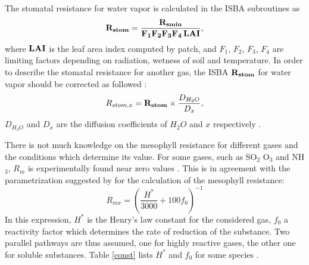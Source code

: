 The stomatal resistance for water vapor is calculated in the ISBA subroutines
as \[ \bf{R_{stom}}=\frac{R_{smin}}{F_1 F_2 F_3 F_4\, LAI},\] where
$\bf{LAI}$ is the leaf area index computed by patch, and $F_1$, $F_2$,
$F_3$, $F_4$ are limiting factors depending on 
radiation, wetness of soil and temperature. In order to describe the stomatal
resistance for another gas, the ISBA $\bf{R_{stom}}$ for water vapor should be
corrected as followed :
\[ R_{stom,x}={\bf{R_{stom}}} \times \frac{D_{H_2O}}{D_x},\]
$D_{H_2O}$ and ${D_x}$ are the diffusion coefficients of $H_2O$ and $x$
respectively \citep{Wesely1989}.

\medskip

There is not much knowledge on the mesophyll resistance for different gases and
the conditions which determine its value. For some gases, such as SO$_2$ %
O$_3$ %
and NH$_3$, %
$R_m$ is experimentally found near zero values \citep{Erisman1994}.
This is in agreement with the parametrization suggested by \cite{Wesely1989}
for the calculation of the mesophyll resistance:
\[ R_{mx} = ( \frac{H^*}{3000} + 100 f_0) ^{-1} \] 
In this expression, $H^*$ is the Henry's law constant for the considered gas,
$f_0$ a reactivity factor which determines the rate of reduction of the
substance. Two parallel pathways are thus assumed, one for highly reactive
gases, the other one for soluble substances. Table \ref{const} 
lists $H^*$ and
$f_0$ for some species \citep{Baer1992}.

